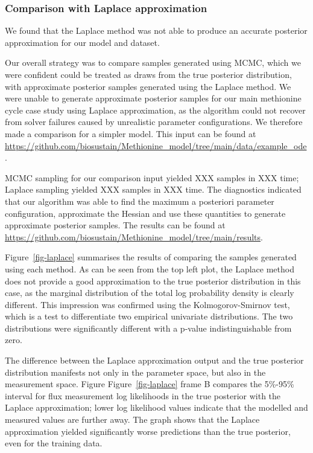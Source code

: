 \documentclass[journal=asbcd6,manuscript=article,layout=traditional]{achemso}
\begin{document}
\hypertarget{sec-laplace}{%
\subsubsection{Comparison with Laplace
approximation}\label{sec-laplace}}

We found that the Laplace method was not able to produce an accurate
posterior approximation for our model and dataset.

Our overall strategy was to compare samples generated using MCMC, which
we were confident could be treated as draws from the true posterior
distribution, with approximate posterior samples generated using the
Laplace method. We were unable to generate approximate posterior samples
for our main methionine cycle case study using Laplace approximation, as
the algorithm could not recover from solver failures caused by
unrealistic parameter configurations. We therefore made a comparison for
a simpler model. This input can be found at
\url{https://github.com/biosustain/Methionine_model/tree/main/data/example_ode}.

MCMC sampling for our comparison input yielded XXX samples in XXX time;
Laplace sampling yielded XXX samples in XXX time. The diagnostics
indicated that our algorithm was able to find the maximum a posteriori
parameter configuration, approximate the Hessian and use these
quantities to generate approximate posterior samples. The results can be
found at
\url{https://github.com/biosustain/Methionine_model/tree/main/results}.

Figure~\ref{fig-laplace} summarises the results of comparing the samples
generated using each method. As can be seen from the top left plot, the
Laplace method does not provide a good approximation to the true
posterior distribution in this case, as the marginal distribution of the
total log probability density is clearly different. This impression was
confirmed using the Kolmogorov-Smirnov test, which is a test to
differentiate two empirical univariate distributions. The two
distributions were significantly different with a p-value
indistinguishable from zero.

The difference between the Laplace approximation output and the true
posterior distribution manifests not only in the parameter space, but
also in the measurement space. Figure Figure~\ref{fig-laplace} frame B
compares the 5\%-95\% interval for flux measurement log likelihoods in
the true posterior with the Laplace approximation; lower log likelihood
values indicate that the modelled and measured values are further away.
The graph shows that the Laplace approximation yielded significantly
worse predictions than the true posterior, even for the training data.
\end{document}
